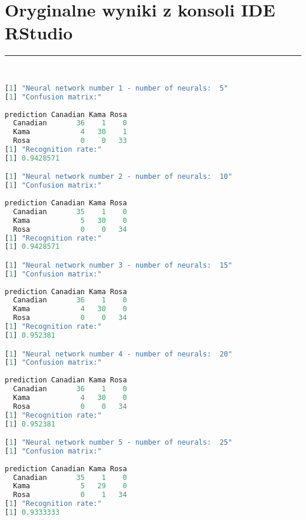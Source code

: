 \documentclass[a4paper,12pt]{article}
\newcommand{\linia}{\rule{\linewidth}{0.5pt}}
\theoremstyle{mytheor}
\begin{document}
\section*{Oryginalne wyniki z konsoli IDE RStudio}
\linia\\
\begin{lstlisting}[language=R]
[1] "Neural network number 1 - number of neurals:  5"
[1] "Confusion matrix:"
          
prediction Canadian Kama Rosa
  Canadian       36    1    0
  Kama            4   30    1
  Rosa            0    0   33
[1] "Recognition rate:"
[1] 0.9428571

[1] "Neural network number 2 - number of neurals:  10"
[1] "Confusion matrix:"
          
prediction Canadian Kama Rosa
  Canadian       35    1    0
  Kama            5   30    0
  Rosa            0    0   34
[1] "Recognition rate:"
[1] 0.9428571

[1] "Neural network number 3 - number of neurals:  15"
[1] "Confusion matrix:"
          
prediction Canadian Kama Rosa
  Canadian       36    1    0
  Kama            4   30    0
  Rosa            0    0   34
[1] "Recognition rate:"
[1] 0.952381

[1] "Neural network number 4 - number of neurals:  20"
[1] "Confusion matrix:"
          
prediction Canadian Kama Rosa
  Canadian       36    1    0
  Kama            4   30    0
  Rosa            0    0   34
[1] "Recognition rate:"
[1] 0.952381

[1] "Neural network number 5 - number of neurals:  25"
[1] "Confusion matrix:"
          
prediction Canadian Kama Rosa
  Canadian       35    1    0
  Kama            5   29    0
  Rosa            0    1   34
[1] "Recognition rate:"
[1] 0.9333333
\end{lstlisting}
\end{document}
